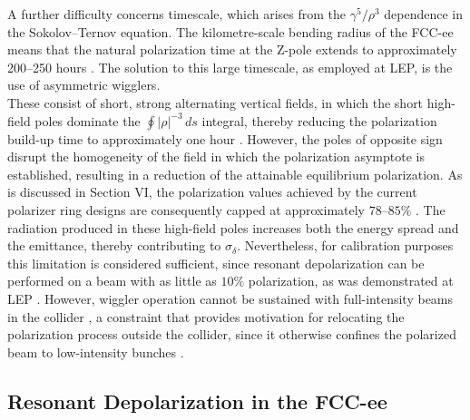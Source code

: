 \documentclass[%
 aip,
 amsmath,amssymb,
 reprint,%
superscriptaddress
]{revtex4-2}
\begin{document}
A further difficulty concerns timescale, which arises from the $\gamma^5/\rho^3$ dependence in the Sokolov–Ternov equation.
The kilometre-scale bending radius of the FCC-ee means that the natural polarization time at the Z-pole extends to approximately 200–250 hours \cite{blondel_polarization_2019,keintzel:ipac2026-mop1037}.
The solution to this large timescale, as employed at LEP, is the use of asymmetric wigglers.
\\
These consist of short, strong alternating vertical fields, in which the short high-field poles dominate the $\oint |\rho|^{-3} \, ds$ integral, thereby reducing the polarization build-up time to approximately one hour \cite{blondel_polarization_2019,keintzel_wu_kiel_sagan_wilkinson_oide_bauche_hofle_blondel_jiang_2025,keskar_bartosik_carli_2026}.
However, the poles of opposite sign disrupt the homogeneity of the field in which the polarization asymptote is established, resulting in a reduction of the attainable equilibrium polarization.
As is discussed in Section VI, the polarization values achieved by the current polarizer ring designs are consequently capped at approximately $78$–$85\%$ \cite{keskar_bartosik_carli_2026}.
The radiation produced in these high-field poles increases both the energy spread and the emittance, thereby contributing to $\sigma_\delta$.
Nevertheless, for calibration purposes this limitation is considered sufficient, since resonant depolarization can be performed on a beam with as little as $10\%$ polarization, as was demonstrated at LEP \cite{blondel_polarization_2019,keintzel_wu_kiel_sagan_wilkinson_oide_bauche_hofle_blondel_jiang_2025}.
However, wiggler operation cannot be sustained with full-intensity beams in the collider \cite{keintzel_wu_kiel_sagan_wilkinson_oide_bauche_hofle_blondel_jiang_2025,keskar_bartosik_carli_2026}, a constraint that provides motivation for relocating the polarization process outside the collider, since it otherwise confines the polarized beam to low-intensity bunches \cite{keskar_bartosik_carli_2026}.

\subsection{Resonant Depolarization in the FCC-ee}
\end{document}
